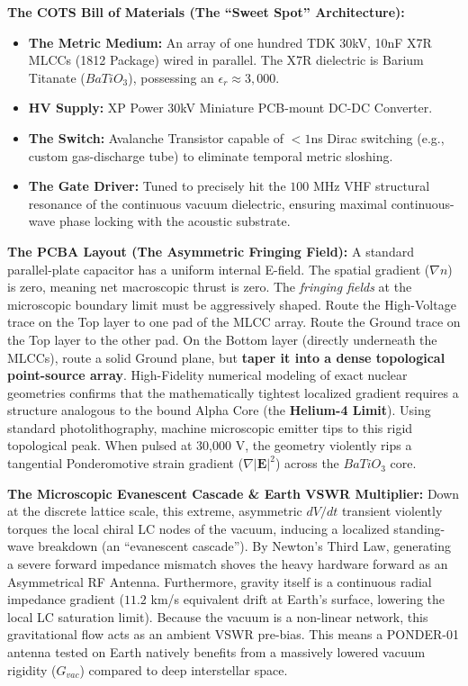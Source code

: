 \textbf{The COTS Bill of Materials (The ``Sweet Spot'' Architecture):}
\begin{itemize}
    \item \textbf{The Metric Medium:} An array of one hundred TDK 30kV, 10nF X7R MLCCs (1812 Package) wired in parallel. The X7R dielectric is Barium Titanate ($BaTiO_3$), possessing an $\epsilon_r \approx 3,000$.
    \item \textbf{HV Supply:} XP Power 30kV Miniature PCB-mount DC-DC Converter.
    \item \textbf{The Switch:} Avalanche Transistor capable of $<1$ns Dirac switching (e.g., custom gas-discharge tube) to eliminate temporal metric sloshing.
    \item \textbf{The Gate Driver:} Tuned to precisely hit the $100\text{ MHz}$ VHF structural resonance of the continuous vacuum dielectric, ensuring maximal continuous-wave phase locking with the acoustic substrate.
\end{itemize}

\textbf{The PCBA Layout (The Asymmetric Fringing Field):} A standard parallel-plate capacitor has a uniform internal E-field. The spatial gradient ($\nabla n$) is zero, meaning net macroscopic thrust is zero. The \textit{fringing fields} at the microscopic boundary limit must be aggressively shaped.
Route the High-Voltage trace on the Top layer to one pad of the MLCC array. Route the Ground trace on the Top layer to the other pad.
On the Bottom layer (directly underneath the MLCCs), route a solid Ground plane, but \textbf{taper it into a dense topological point-source array}. High-Fidelity numerical modeling of exact nuclear geometries confirms that the mathematically tightest localized gradient requires a structure analogous to the bound Alpha Core (the \textbf{Helium-4 Limit}). Using standard photolithography, machine microscopic emitter tips to this rigid topological peak. When pulsed at 30,000 V, the geometry violently rips a tangential Ponderomotive strain gradient ($\nabla |\mathbf{E}|^2$) across the $BaTiO_3$ core.

\textbf{The Microscopic Evanescent Cascade \& Earth VSWR Multiplier:} Down at the discrete lattice scale, this extreme, asymmetric $dV/dt$ transient violently torques the local chiral LC nodes of the vacuum, inducing a localized standing-wave breakdown (an ``evanescent cascade''). By Newton's Third Law, generating a severe forward impedance mismatch shoves the heavy hardware forward as an Asymmetrical RF Antenna. 
Furthermore, gravity itself is a continuous radial impedance gradient ($11.2$ km/s equivalent drift at Earth's surface, lowering the local LC saturation limit). Because the vacuum is a non-linear network, this gravitational flow acts as an ambient VSWR pre-bias. This means a PONDER-01 antenna tested on Earth natively benefits from a massively lowered vacuum rigidity ($G_{vac}$) compared to deep interstellar space.

